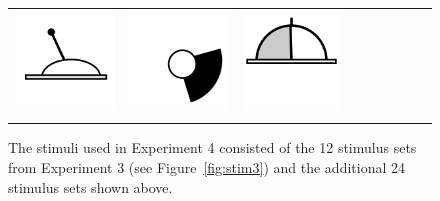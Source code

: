 \documentclass[doc]{apa6}
\newcommand{\stimulusscale}{.1}
\begin{document}
\begin{figure}[t]
\begin{center}
\begin{tabular}{c|cccccccc}
\includegraphics[scale=\stimulusscale]{./set34stim75.png} &
\includegraphics[scale=\stimulusscale]{./set35stim75.png} &
\includegraphics[scale=\stimulusscale]{./set36stim75.png} \\
\multicolumn{1}{c}{} \\
\end{tabular}
\caption{The stimuli used in Experiment 4 consisted of the 12 stimulus sets from Experiment 3 (see Figure~\protect\ref{fig:stim3}) and the additional 24 stimulus sets shown above.}
\label{fig:stim4}
\end{center}
\end{figure}
\end{document}
